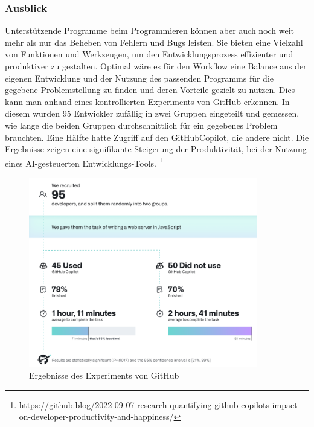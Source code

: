 \documentclass[11pt,a4paper]{article}
\begin{document}
\subsubsection{Ausblick}
Unterstützende Programme beim Programmieren können aber auch noch weit mehr als nur das Beheben von Fehlern und Bugs leisten. Sie bieten eine Vielzahl von Funktionen und Werkzeugen, um den Entwicklungsprozess effizienter und produktiver zu gestalten.
Optimal wäre es für den Workflow eine Balance aus der eigenen Entwicklung und der Nutzung des passenden Programms für die gegebene Problemstellung zu finden und deren Vorteile gezielt zu nutzen. Dies kann man anhand eines kontrollierten Experiments von GitHub erkennen. In diesem wurden 95 Entwickler zufällig in zwei Gruppen eingeteilt und gemessen, wie lange die beiden Gruppen durchschnittlich für ein gegebenes Problem brauchten.
Eine Hälfte hatte Zugriff auf den GitHubCopilot, die andere nicht. Die Ergebnisse zeigen eine signifikante Steigerung der Produktivität, bei der Nutzung eines AI-gesteuerten Entwicklungs-Tools. \footnote{https://github.blog/2022-09-07-research-quantifying-github-copilots-impact-on-developer-productivity-and-happiness/}
\begin{figure}[h!]
\includegraphics[width=100mm,scale=0.3, center]{copilot.png}
\caption{Ergebnisse des Experiments von GitHub}
\label{fig:figure5}
\end{figure}








\end{document}
